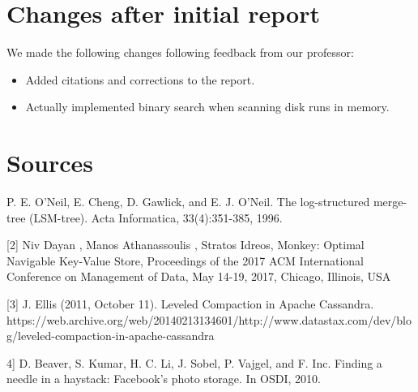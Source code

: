 \documentclass[12pt]{article}
\begin{document}
\section{Changes after initial report}

\indent \indent We made the following changes following feedback from our professor:

\begin{itemize}
\item Added citations and corrections to the report.
\item Actually implemented binary search when scanning disk runs in memory.
\end{itemize}

\section*{Sources}
\indent \indent [1] P. E. O'Neil, E. Cheng, D. Gawlick, and E. J. O'Neil. The
log-structured merge-tree (LSM-tree). Acta Informatica,
33(4):351-385, 1996.

[2] Niv Dayan , Manos Athanassoulis , Stratos Idreos, Monkey: Optimal Navigable Key-Value Store, Proceedings of the 2017 ACM International Conference on Management of Data, May 14-19, 2017, Chicago, Illinois, USA

[3] J. Ellis (2011, October 11). Leveled Compaction in Apache Cassandra. https://web.archive.org/web/20140213134601/http://www.datastax.com/dev/blog/leveled-compaction-in-apache-cassandra 

4] D. Beaver, S. Kumar, H. C. Li, J. Sobel, P. Vajgel, and F. Inc. Finding a needle in a haystack: Facebook's photo storage. In OSDI, 2010.
\end{document}
